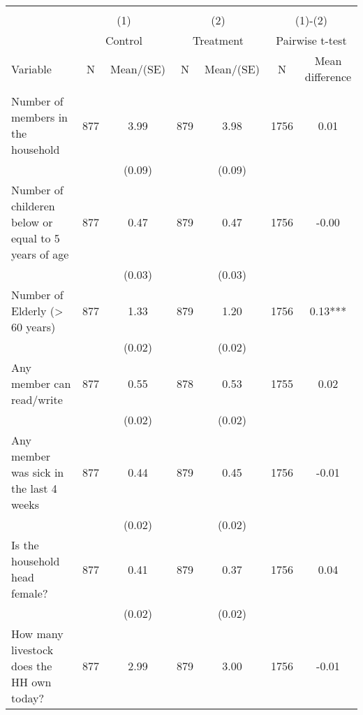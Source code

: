 
\begin{tabular}{@{\extracolsep{5pt}}lcccccc}
\\[-1.8ex]\hline \hline \\[-1.8ex]
 & \multicolumn{2}{c}{(1)}  & \multicolumn{2}{c}{(2)}  & \multicolumn{2}{c}{(1)-(2)} \\
 & \multicolumn{2}{c}{Control}  & \multicolumn{2}{c}{Treatment}  & \multicolumn{2}{c}{Pairwise t-test}  \\
Variable & N & Mean/(SE) & N & Mean/(SE) & N & Mean difference \\ \hline \\[-1.8ex] 
Number of members in the household   & 877    & 3.99    & 879    & 3.98    & 1756    & 0.01   \\
 &   & (0.09)  &   & (0.09)  &   &  \\ [1ex]
Number of childeren below or equal to 5 years of age   & 877    & 0.47    & 879    & 0.47    & 1756    & -0.00   \\
 &   & (0.03)  &   & (0.03)  &   &  \\ [1ex]
Number of Elderly (> 60 years)   & 877    & 1.33    & 879    & 1.20    & 1756    & 0.13***   \\
 &   & (0.02)  &   & (0.02)  &   &  \\ [1ex]
Any member can read/write   & 877    & 0.55    & 878    & 0.53    & 1755    & 0.02   \\
 &   & (0.02)  &   & (0.02)  &   &  \\ [1ex]
Any member was sick in the last 4 weeks   & 877    & 0.44    & 879    & 0.45    & 1756    & -0.01   \\
 &   & (0.02)  &   & (0.02)  &   &  \\ [1ex]
Is the household head female?   & 877    & 0.41    & 879    & 0.37    & 1756    & 0.04   \\
 &   & (0.02)  &   & (0.02)  &   &  \\ [1ex]
How many livestock does the HH own today?   & 877    & 2.99    & 879    & 3.00    & 1756    & -0.01   \\

\end{tabular}
